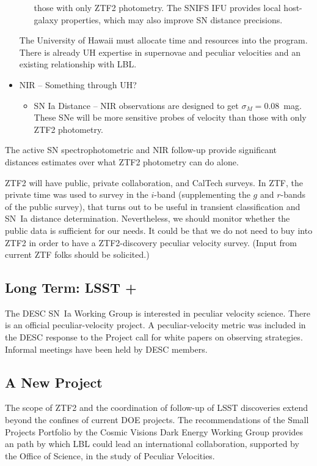\begin{itemize}
\begin{itemize}
those with only ZTF2 photometry.  The SNIFS IFU provides local host-galaxy properties, which may also improve SN distance precisions.
\end{itemize}
The University of Hawaii must allocate time and resources into the program.  There is already UH expertise in supernovae and peculiar velocities and an existing relationship
with LBL.
\item NIR -- Something through UH?
\begin{itemize}
\item SN Ia Distance -- NIR observations are designed to get $\sigma_M=0.08$~mag.  These SNe will be more sensitive probes of velocity
than those with only ZTF2 photometry.
\end{itemize}
\end{itemize}
The active SN spectrophotometric and NIR follow-up provide significant distances estimates over
what ZTF2 photometry can do alone.




ZTF2 will have public, private collaboration, and CalTech surveys.    In ZTF,
the private time was used to survey in the $i$-band (supplementing the $g$ and $r$-bands of the public survey), that turns out to be useful in transient classification and SN~Ia distance determination.
Nevertheless, we should monitor whether the public data is sufficient for our needs.  It could be that we do not need to buy into ZTF2 in order to have
a ZTF2-discovery peculiar velocity survey.  (Input from current ZTF folks should be solicited.)

\subsection{Long Term: LSST +}
The DESC SN~Ia Working Group is interested in peculiar velocity science.  There is an official peculiar-velocity project.  A peculiar-velocity
metric was included in the DESC response to the Project call for white papers on observing strategies.
Informal meetings have been held by DESC members.

\subsection{A New Project}
The scope of ZTF2 and the coordination of follow-up of LSST discoveries extend beyond the confines
of current DOE projects.  The recommendations
of the  Small Projects Portfolio  by the  Cosmic Visions Dark Energy Working Group
provides an path by which LBL could lead an international collaboration,
supported by the Office of Science, in the study of Peculiar Velocities.


